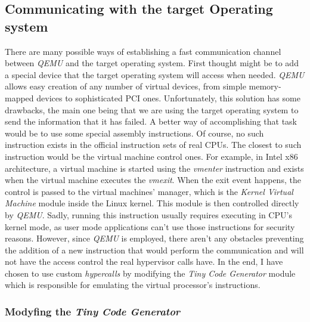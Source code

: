 \subsection{Communicating with the target Operating system}
There are many possible ways of establishing a fast communication channel between \textit{QEMU} and the target operating system. First thought might be to add a special device that the target operating system will access when needed. \textit{QEMU} allows easy creation of any number of virtual devices, from simple memory-mapped devices to sophisticated PCI ones. Unfortunately, this solution has some drawbacks, the main one being that we are using the target operating system to send the information that it has failed. A better way of accomplishing that task would be to use some special assembly instructions. Of course, no such instruction exists in the official instruction sets of real CPUs. The closest to such instruction would be the virtual machine control ones. For example, in Intel x86 architecture, a virtual machine is started using the \textit{vmenter} instruction and exists when the virtual machine executes the \textit{vmexit}. When the exit event happens, the control is passed to the virtual machines' manager, which is the \textit{Kernel Virtual Machine} module inside the Linux kernel. This module is then controlled directly by \textit{QEMU}. Sadly, running this instruction usually requires executing in CPU's kernel mode, as user mode applications can't use those instructions for security reasons. However, since \textit{QEMU} is employed, there aren't any obstacles preventing the addition of a new instruction that would perform the communication and will not have the access control the real hypervisor calls have. In the end, I have chosen to use custom \textit{hypercalls} by modifying the \textit{Tiny Code Generator} module which is responsible for emulating the virtual processor's instructions.

\subsubsection{Modyfing the \textit{Tiny Code Generator}} \label{sec:tcg}
